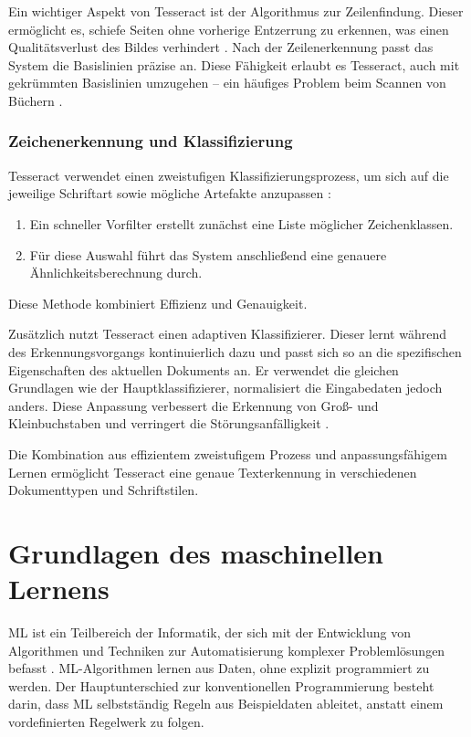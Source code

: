 Ein wichtiger Aspekt von Tesseract ist der Algorithmus zur Zeilenfindung. Dieser ermöglicht es, schiefe Seiten ohne vorherige Entzerrung zu erkennen, was einen Qualitätsverlust des Bildes verhindert \parencite{SmithR_2007_AOot}. Nach der Zeilenerkennung passt das System die Basislinien präzise an. Diese Fähigkeit erlaubt es Tesseract, auch mit gekrümmten Basislinien umzugehen – ein häufiges Problem beim Scannen von Büchern \parencite{SmithR_2007_AOot}.

\subsubsection{Zeichenerkennung und Klassifizierung}
\label{subsubsec:zeichenerkennung-und-klassifizierung}

Tesseract verwendet einen zweistufigen Klassifizierungsprozess, um sich auf die jeweilige Schriftart sowie mögliche Artefakte anzupassen \parencite{SmithR_2007_AOot}:

\begin{enumerate}
	\item Ein schneller Vorfilter erstellt zunächst eine Liste möglicher Zeichenklassen.
	\item Für diese Auswahl führt das System anschließend eine genauere Ähnlichkeitsberechnung durch.
\end{enumerate}

Diese Methode kombiniert Effizienz und Genauigkeit. 

Zusätzlich nutzt Tesseract einen adaptiven Klassifizierer. Dieser lernt während des Erkennungsvorgangs kontinuierlich dazu und passt sich so an die spezifischen Eigenschaften des aktuellen Dokuments an. Er verwendet die gleichen Grundlagen wie der Hauptklassifizierer, normalisiert die Eingabedaten jedoch anders. Diese Anpassung verbessert die Erkennung von Groß- und Kleinbuchstaben und verringert die Störungsanfälligkeit \parencite{SmithR_2007_AOot}.

Die Kombination aus effizientem zweistufigem Prozess und anpassungsfähigem Lernen ermöglicht Tesseract eine genaue Texterkennung in verschiedenen Dokumenttypen und Schriftstilen.

\section{Grundlagen des maschinellen Lernens}
\label{sec:grundlagen-des-maschinellen-lernens}

\gls{ML} ist ein Teilbereich der Informatik, der sich mit der Entwicklung von Algorithmen und Techniken zur Automatisierung komplexer Problemlösungen befasst \parencite{RebalaGopinath2019AItM}. \gls{ML}-Algorithmen lernen aus Daten, ohne explizit programmiert zu werden. Der Hauptunterschied zur konventionellen Programmierung besteht darin, dass \gls{ML} selbstständig Regeln aus Beispieldaten ableitet, anstatt einem vordefinierten Regelwerk zu folgen.

